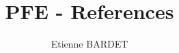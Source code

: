 \documentclass [11pt]{article}
\title{PFE - References}
\author{Etienne BARDET}
\begin{document}
\maketitle
\nocite{*}


\end{document}
